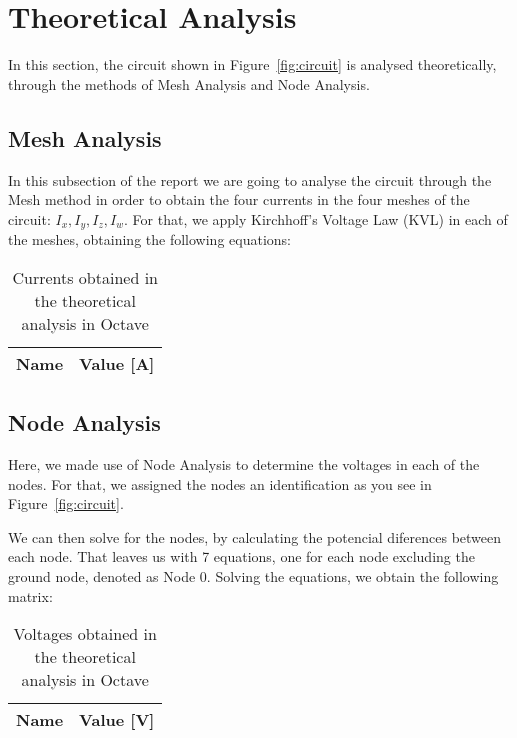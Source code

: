 \section{Theoretical Analysis}
\label{sec:analysis}

\tab In this section, the circuit shown in Figure~\ref{fig:circuit} is analysed
theoretically, through the methods of Mesh Analysis and Node Analysis.

\subsection{Mesh Analysis}
\tab In this subsection of the report we are going to analyse the circuit through the Mesh method in order to obtain the four currents in the four meshes of the circuit: $I_x, I_y, I_z, I_w$.
For that, we apply Kirchhoff's Voltage Law (KVL) in each of the meshes, obtaining the following equations: 
\begin{table}[h]
  \centering
  \begin{tabular}{|l|r|}
    \hline    
    {\bf Name} & {\bf Value [A]} \\ \hline
	
  \end{tabular}
  \caption{Currents obtained in the theoretical analysis in Octave}
  \label{tab:octave_currents}
\end{table}
\subsection{Node Analysis}

\tab Here, we made use of Node Analysis to determine the voltages in each
of the nodes. For that, we assigned the nodes an identification as you see
in Figure~\ref{fig:circuit}.\par
We can then solve for the nodes, by calculating the potencial diferences between each node. That leaves us with 7 equations, one for each node excluding the ground node, denoted as Node 0.
Solving the equations, we obtain the following matrix:
\begin{table}[h]
  \centering
  \begin{tabular}{|l|r|}
    \hline    
    {\bf Name} & {\bf Value [V]} \\ \hline
	
  \end{tabular}
  \caption{Voltages obtained in the theoretical analysis in Octave}
  \label{tab:octave_currents}
\end{table}

